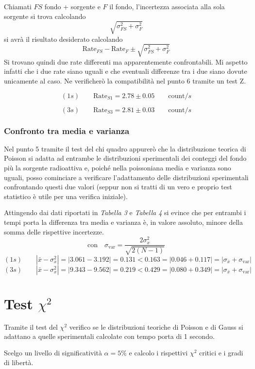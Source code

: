 \documentclass{article}
\begin{document}
Chiamati $FS$ fondo + sorgente e $F$ il fondo, l'incertezza associata alla sola sorgente si trova calcolando
\[
	\sqrt{\sigma_{FS}^2 + \sigma_{F}^2}
\]
si avrà il risultato desiderato calcolando
\[
	\text{Rate}_{FS} - \text{Rate}_F \pm \sqrt{\sigma_{FS}^2 + \sigma_{F}^2}
\]
Si trovano quindi due rate differenti ma apparentemente confrontabili. Mi aspetto infatti che i due rate siano uguali e che eventuali differenze tra i due siano dovute unicamente al caso. Ne verificherò la compatibilità nel punto 6 tramite un test Z.

\[
	(1s) \qquad \text{Rate}_{S1} = 2.78 \pm 0.05 \qquad \text{count}/s
\]

\[
	(3s) \qquad \text{Rate}_{S3} =  2.81 \pm 0.03  \qquad \text{count}/s
\]

\subsubsection*{Confronto tra media e varianza}
Nel punto 5 tramite il test del chi quadro appurerò che la distribuzione teorica di Poisson si adatta ad entrambe le distribuzioni sperimentali dei conteggi del fondo più la sorgente radioattiva e, poiché nella poissoniana media e varianza sono uguali, posso cominciare a verificare l'adattamento delle distribuzioni sperimentali confrontando questi due valori (seppur non si tratti di un vero e proprio test statistico è utile per una verifica iniziale). 

Attingendo dai dati riportati in \textit{Tabella 3} e \textit{Tabella 4} si evince che per entrambi i tempi porta la differenza tra media e varianza è, in valore assoluto, minore della somma delle rispettive incertezze. 
\[
	\text{con} \quad \sigma_{\text{var}} = \frac{2\sigma_x^2}{\sqrt{2(N-1)}}
\]
\[
	(1s) \qquad |\bar{x} - \sigma_x^2| = 	|3.061 - 3.192| = \mathbf{0.131  < 0.163} = |0.046 + 0.117| =|\sigma_{\bar{x}} + \sigma_{\text{var}}| 
\]
\[
	(3s) \qquad |\bar{x} - \sigma_x^2| = 	|9.343 - 9.562| = \mathbf{0.219  < 0.429} = |0.080 + 0.349| =|\sigma_{\bar{x}} + \sigma_{\text{var}}| 
\]

\newpage
\section{Test \texorpdfstring{\(\chi^2\)}{chi}}
Tramite il test del \(\chi^2\) verifico se le distribuzioni teoriche di Poisson e di Gauss si adattano a quelle sperimentali calcolate con tempo porta di 1 secondo. 


Scelgo un livello di significatività $\alpha = 5\%$ e calcolo i rispettivi $\chi^2$ critici e i gradi di libertà.
\end{document}
